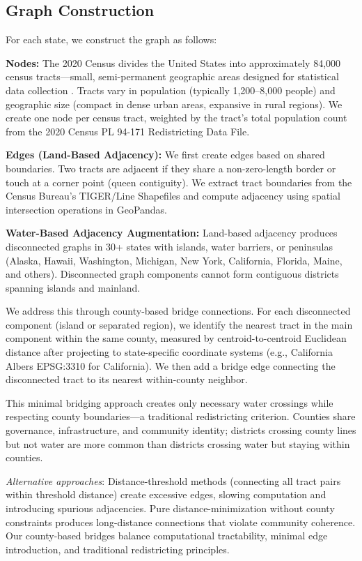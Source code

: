 \subsection{Graph Construction}

For each state, we construct the graph as follows:

\textbf{Nodes:} The 2020 Census divides the United States into approximately 84,000 census tracts—small, semi-permanent geographic areas designed for statistical data collection \cite{census2020redistricting}. Tracts vary in population (typically 1,200--8,000 people) and geographic size (compact in dense urban areas, expansive in rural regions). We create one node per census tract, weighted by the tract's total population count from the 2020 Census PL 94-171 Redistricting Data File.

\textbf{Edges (Land-Based Adjacency):} We first create edges based on shared boundaries. Two tracts are adjacent if they share a non-zero-length border or touch at a corner point (queen contiguity). We extract tract boundaries from the Census Bureau's TIGER/Line Shapefiles \cite{census2020tigerline} and compute adjacency using spatial intersection operations in GeoPandas.

\textbf{Water-Based Adjacency Augmentation:} Land-based adjacency produces disconnected graphs in 30+ states with islands, water barriers, or peninsulas (Alaska, Hawaii, Washington, Michigan, New York, California, Florida, Maine, and others). Disconnected graph components cannot form contiguous districts spanning islands and mainland.

We address this through county-based bridge connections. For each disconnected component (island or separated region), we identify the nearest tract in the main component within the same county, measured by centroid-to-centroid Euclidean distance after projecting to state-specific coordinate systems (e.g., California Albers EPSG:3310 for California). We then add a bridge edge connecting the disconnected tract to its nearest within-county neighbor.

This minimal bridging approach creates only necessary water crossings while respecting county boundaries—a traditional redistricting criterion. Counties share governance, infrastructure, and community identity; districts crossing county lines but not water are more common than districts crossing water but staying within counties.

\textit{Alternative approaches}: Distance-threshold methods (connecting all tract pairs within threshold distance) create excessive edges, slowing computation and introducing spurious adjacencies. Pure distance-minimization without county constraints produces long-distance connections that violate community coherence. Our county-based bridges balance computational tractability, minimal edge introduction, and traditional redistricting principles.

